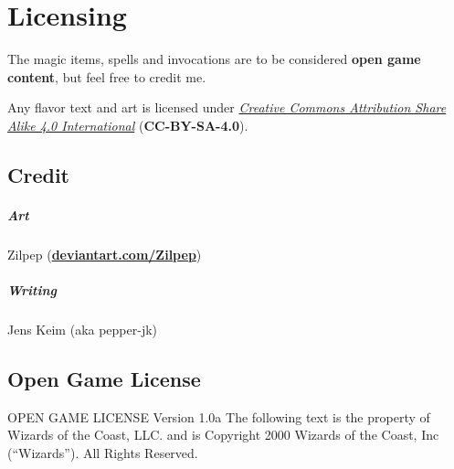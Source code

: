 \documentclass[letter,10pt,twocolumn,openany]{dndbook}
\begin{document}
\backmatter

\chapter{Licensing}

The magic items, spells and invocations are to be considered \textbf{open game content}, but feel free to credit me.

Any flavor text and art is licensed under \href{https://creativecommons.org/licenses/by-sa/4.0/legalcode}{\textit{Creative Commons Attribution Share Alike 4.0 International}} (\textbf{CC-BY-SA-4.0}).

\section{Credit}

\paragraph{Art} Zilpep (\href{https://www.deviantart.com/zilpep}{\textbf{deviantart.com/Zilpep}})
\paragraph{Writing} Jens Keim (aka pepper-jk)

\section{Open Game License}

OPEN GAME LICENSE Version 1.0a The following text is the property of Wizards of the Coast, LLC. and is Copyright 2000 Wizards of the Coast, Inc (“Wizards”). All Rights Reserved.
\end{document}

